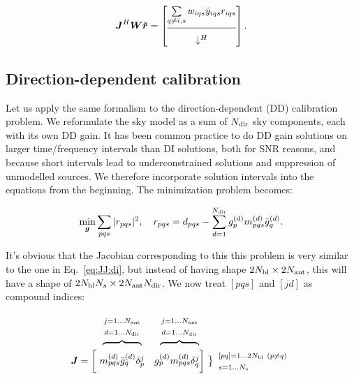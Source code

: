 \documentclass[useAMS,usenatbib]{mn2e}
\makeatletter
\newcommand{\mat}[1]{{\bmath{#1}}}
\newcommand{\JJ}{\mat{J}} %
\newcommand{\MM}{\mat{M}}
\newcommand{\GG}{\mat{G}}
\newcommand{\Matrix}[2]{\left [ \begin{array}{@{}#1@{}}#2\end{array} \right ]}
\newcommand{\Stack}[1]{\begin{array}{@{}c@{}}#1\end{array}}
\newcommand{\AUG}[1]{\bmath{\breve{#1}}}
\newcommand{\Rr}{\AUG{r}}
\makeatother
\begin{document}
\begin{equation}
\label{eq:JHR:DI:tfw}
\JJ^H\mat{W}\Rr 
= \Matrix{c}{
\sum\limits_{q\ne i,s} w_{iqs} \bar{y}_{iqs} r_{iqs}   \\
\hline\\[-8pt]
\downarrow^H
}.
\end{equation}


\subsection{Direction-dependent calibration}
\label{sec:unpol:DD}

Let us apply the same formalism to the direction-dependent (DD) calibration problem. 
We reformulate the sky model as a sum of $N_\mathrm{dir}$ sky components, each with its own DD 
gain. It has been common practice to do DD gain solutions on larger time/frequency intervals than DI 
solutions, both for SNR reasons, and because short intervals lead to underconstrained solutions
and suppression of unmodelled sources. We therefore incorporate solution intervals into the
equations from the beginning. The minimization problem becomes:

\newcommand{\GGd}{\GG^{(d)}}
\newcommand{\GGdH}{\GG^{(d)H}}
\newcommand{\MMd}{\MM^{(d)}}
\newcommand{\YYd}{\YY^{(d)}}
\newcommand{\YYdH}{\YY^{(d)H}}
\newcommand{\YYc}{\YY^{(c)}}
\newcommand{\YYcH}{\YY^{(c)H}}
\newcommand{\ggd}{g^{(d)}}
\newcommand{\ggdH}{\bar{g}^{(d)}}
\newcommand{\ggc}{g^{(c)}}
\newcommand{\ggcH}{\bar{g}^{(c)}}
\newcommand{\mmc}{m^{(c)}}
\newcommand{\mmd}{m^{(d)}}
\newcommand{\mmcH}{\bar{m}^{(c)}}
\newcommand{\mmdH}{\bar{m}^{(d)}}
\newcommand{\yyd}{y^{(d)}}
\newcommand{\yydH}{\bar{y}^{(d)}}
\newcommand{\yyc}{y^{(c)}}
\newcommand{\yycH}{\bar{y}^{(c)}}

\begin{equation}
\label{eq:cal:dd:unpol}
\min_{\bmath{g}}\sum_{pqs}|r_{pqs}|^2, ~~~
r_{pqs} = d_{pqs} - \sum_{d=1}^{\Nd} \ggd_p \mmd_{pqs} \ggdH_q.
\end{equation}

It's obvious that the Jacobian corresponding to this  this problem is very similar to the one 
in Eq.~\ref{eq:JJ:di}, but instead of having shape $2N_\mathrm{bl}\times2N_\mathrm{ant}$, this will have a 
shape of $2N_\mathrm{bl}N_s\times 2N_\mathrm{ant}N_\mathrm{dir}$. We now treat $[pqs]$ and $[jd]$ as compound indices: 

\[
\begin{array}{r@{~}cc@{~}cc}
 & \overbrace{~~~~~~~~~~~~}^{\Stack{\scriptstyle j=1\dots \Na\\\scriptstyle d=1\dots \Nd}} & 
   \overbrace{~~~~~~~~~~~~}^{\Stack{\scriptstyle j=1\dots \Na\\\scriptstyle d=1\dots \Nd}} \\
\JJ = \bigg [ &
  \mmd_{pqs}\ggdH_q \delta^j_p & 
  \ggd_p \mmd_{pqs}  \delta^j_q 
\bigg ] &
\big \}
\begin{array}{l}
\scriptstyle [pq]=1\dots 2\Nbl~(p\ne q)\\ \scriptstyle s=1\dots\Ns
\end{array}

\end{array}
\]
\end{document}
